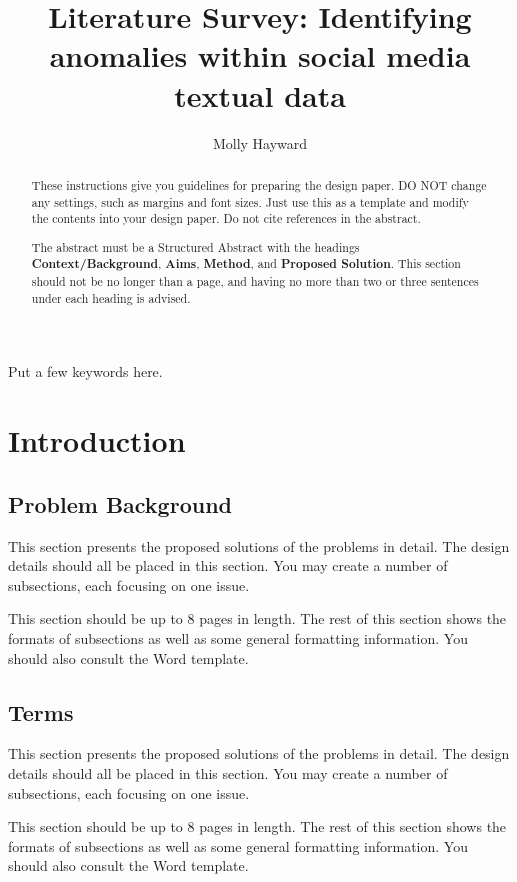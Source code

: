 \documentclass[12pt,a4paper]{article}
\title{Literature Survey: Identifying anomalies within social media textual data}
\author{Molly Hayward}
\date{}
\begin{document}
\maketitle

\begin{abstract}
These instructions give you guidelines for preparing the design paper.  DO NOT change any settings, such as margins and font sizes.  Just use this as a template and modify the contents into your design paper.  Do not cite references in the abstract.

The abstract must be a Structured Abstract with the headings {\bf Context/Background}, {\bf Aims}, {\bf Method}, and {\bf Proposed Solution}.  This section should not be no longer than a page, and having no more than two or three sentences under each heading is advised.
\end{abstract}

\begin{keywords}
Put a few keywords here.
\end{keywords}

\section{Introduction}

\subsection{Problem Background}

This section presents the proposed solutions of the problems in detail. The design details should all be placed in this section. You may create a number of subsections, each focusing on one issue.

This section should be up to 8 pages in length.
The rest of this section shows the formats of subsections as well as some general formatting information.  You should also consult the Word template.

\subsection{Terms}

This section presents the proposed solutions of the problems in detail. The design details should all be placed in this section. You may create a number of subsections, each focusing on one issue.

This section should be up to 8 pages in length.
The rest of this section shows the formats of subsections as well as some general formatting information.  You should also consult the Word template.
\end{document}

